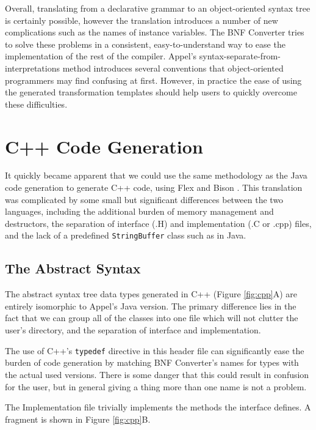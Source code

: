 \documentclass{llncs}
\begin{document}
Overall, translating from a declarative grammar to an object-oriented syntax tree is certainly possible, however the translation introduces a number of new complications such as the names of instance variables. The BNF Converter tries to solve these problems in a consistent, easy-to-understand way to ease the implementation of the rest of the compiler. Appel's syntax-separate-from-interpretations method introduces several conventions that object-oriented programmers may find confusing at first. However, in practice the ease of using the generated transformation templates should help users to quickly overcome these difficulties.



\section{C++ Code Generation}

It quickly became apparent that we could use the same methodology as the Java code generation to generate C++ code, using Flex \cite{flex} and Bison \cite{bison}. This translation was complicated by some small but significant differences between the two languages, including the additional burden of memory management and destructors, the separation of interface (.H) and implementation (.C or .cpp) files, and the lack of a predefined \texttt{StringBuffer} class such as in Java.

\subsection{The Abstract Syntax}

The abstract syntax tree data types generated in C++ (Figure \ref{fig:cpp}A) are entirely isomorphic to Appel's Java version. The primary difference lies in the fact that we can group all of the classes into one file which will not clutter the user's directory, and the separation of interface and implementation.

The use of C++'s \texttt{typedef} directive in this header file can significantly ease the burden of code generation by matching BNF Converter's names for types with the actual used versions. There is some danger that this  could result in confusion for the user, but in general giving a thing more than one name is not a problem.

The Implementation file trivially implements the methods the interface defines. A fragment is shown in Figure \ref{fig:cpp}B.
\end{document}
